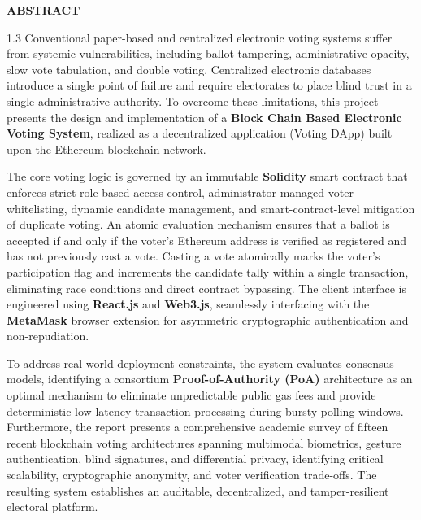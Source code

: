 \newpage
\thispagestyle{plain}

\begin{center}
\vspace*{10pt}
{\bfseries\Large ABSTRACT}\\[20pt]
\end{center}

\begin{spacing}{1.3}
\fontsize{12pt}{17.5pt}\selectfont
\justifying
\noindent Conventional paper-based and centralized electronic voting systems suffer from systemic vulnerabilities, including ballot tampering, administrative opacity, slow vote tabulation, and double voting. Centralized electronic databases introduce a single point of failure and require electorates to place blind trust in a single administrative authority. To overcome these limitations, this project presents the design and implementation of a \textbf{Block Chain Based Electronic Voting System}, realized as a decentralized application (Voting DApp) built upon the Ethereum blockchain network.

\vspace{12pt}

\noindent The core voting logic is governed by an immutable \textbf{Solidity} smart contract that enforces strict role-based access control, administrator-managed voter whitelisting, dynamic candidate management, and smart-contract-level mitigation of duplicate voting. An atomic evaluation mechanism ensures that a ballot is accepted if and only if the voter's Ethereum address is verified as registered and has not previously cast a vote. Casting a vote atomically marks the voter's participation flag and increments the candidate tally within a single transaction, eliminating race conditions and direct contract bypassing. The client interface is engineered using \textbf{React.js} and \textbf{Web3.js}, seamlessly interfacing with the \textbf{MetaMask} browser extension for asymmetric cryptographic authentication and non-repudiation.

\vspace{12pt}

\noindent To address real-world deployment constraints, the system evaluates consensus models, identifying a consortium \textbf{Proof-of-Authority (PoA)} architecture as an optimal mechanism to eliminate unpredictable public gas fees and provide deterministic low-latency transaction processing during bursty polling windows. Furthermore, the report presents a comprehensive academic survey of fifteen recent blockchain voting architectures spanning multimodal biometrics, gesture authentication, blind signatures, and differential privacy, identifying critical scalability, cryptographic anonymity, and voter verification trade-offs. The resulting system establishes an auditable, decentralized, and tamper-resilient electoral platform.
\end{spacing}

\thispagestyle{plain}

